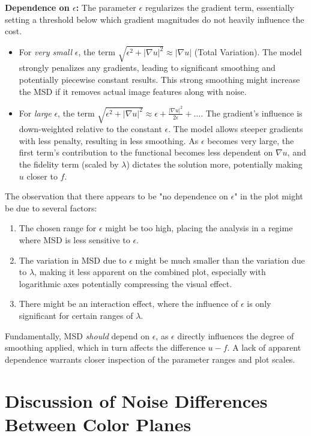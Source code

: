 \documentclass{article}
\begin{document}
	\textbf{Dependence on $\epsilon$:}
	The parameter $\epsilon$ regularizes the gradient term, essentially setting a threshold below which gradient magnitudes do not heavily influence the cost.
	\begin{itemize}
		\item For \textit{very small} $\epsilon$, the term $\sqrt{\epsilon^2 + |\nabla u|^2} \approx |\nabla u|$ (Total Variation). The model strongly penalizes any gradients, leading to significant smoothing and potentially piecewise constant results. This strong smoothing might increase the MSD if it removes actual image features along with noise.
		\item For \textit{large} $\epsilon$, the term $\sqrt{\epsilon^2 + |\nabla u|^2} \approx \epsilon + \frac{|\nabla u|^2}{2\epsilon} + \dots$. The gradient's influence is down-weighted relative to the constant $\epsilon$. The model allows steeper gradients with less penalty, resulting in less smoothing. As $\epsilon$ becomes very large, the first term's contribution to the functional becomes less dependent on $\nabla u$, and the fidelity term (scaled by $\lambda$) dictates the solution more, potentially making $u$ closer to $f$.
	\end{itemize}
	The observation that there appears to be "no dependence on $\epsilon$" in the plot might be due to several factors:
	\begin{enumerate}
		\item The chosen range for $\epsilon$ might be too high, placing the analysis in a regime where MSD is less sensitive to $\epsilon$.
		\item The variation in MSD due to $\epsilon$ might be much smaller than the variation due to $\lambda$, making it less apparent on the combined plot, especially with logarithmic axes potentially compressing the visual effect.
		\item There might be an interaction effect, where the influence of $\epsilon$ is only significant for certain ranges of $\lambda$.
	\end{enumerate}
	Fundamentally, MSD \textit{should} depend on $\epsilon$, as $\epsilon$ directly influences the degree of smoothing applied, which in turn affects the difference $u-f$. A lack of apparent dependence warrants closer inspection of the parameter ranges and plot scales.
	
	\section{Discussion of Noise Differences Between Color Planes}
	
\end{document}
